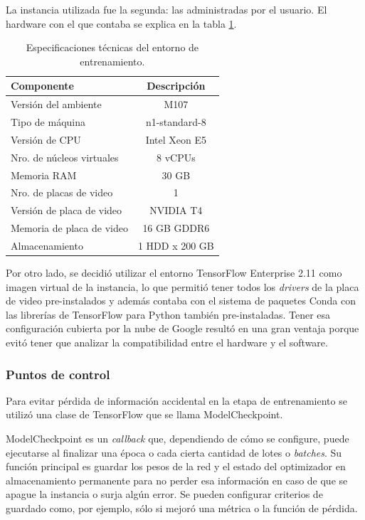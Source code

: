La instancia utilizada fue la segunda: las administradas por el usuario. El hardware con el que contaba se explica en la tabla \ref{tab:vertex}.
\begin{table}[h]
	\centering
	\caption[Especificaciones técnicas Vertex]{Especificaciones técnicas del entorno de entrenamiento.}
	\begin{tabular}{l c}    
		\toprule
		\textbf{Componente}			& 			\textbf{Descripción}  \\
		\midrule	
		Versión del ambiente		& 			M107  \\
		Tipo de máquina 			& 			n1-standard-8  \\
		Versión de CPU				&			Intel Xeon E5 \\
		Nro. de núcleos virtuales 	& 			8 vCPUs \\
		Memoria RAM 				& 			30 GB  \\
		Nro. de placas de video 	& 			1  \\
		Versión de placa de video 	& 			NVIDIA T4 \\
		Memoria de placa de video	& 			16 GB GDDR6  \\
		Almacenamiento				&			1 HDD x 200 GB \\
		\bottomrule
		\hline
	\end{tabular}
	\label{tab:vertex}
\end{table}

Por otro lado, se decidió utilizar el entorno TensorFlow Enterprise 2.11 como imagen virtual de la instancia, lo que permitió tener todos los \textit{drivers} de la placa de video pre-instalados y además contaba con el sistema de paquetes Conda con las librerías de TensorFlow para Python también pre-instaladas. Tener esa configuración cubierta por la nube de Google resultó en una gran ventaja porque evitó tener que analizar la compatibilidad entre el hardware y el software.

\subsubsection{Puntos de control}

Para evitar pérdida de información accidental en la etapa de entrenamiento se utilizó una clase de TensorFlow que se llama ModelCheckpoint.

ModelCheckpoint es un \textit{callback} que, dependiendo de cómo se configure, puede ejecutarse al finalizar una época o cada cierta cantidad de lotes o \textit{batches}. Su función principal es guardar los pesos de la red y el estado del optimizador en almacenamiento permanente para no perder esa información en caso de que se apague la instancia o surja algún error. Se pueden configurar criterios de guardado como, por ejemplo, sólo si mejoró una métrica o la función de pérdida.

